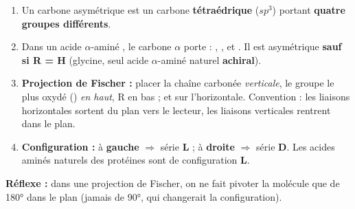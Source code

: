 \documentclass[11pt]{article}
\newcommand{\cle}[1]{{\popxbold\color{popdark}#1}}
\begin{document}
\begin{methode}
\begin{enumerate}
\item Un \cle{carbone asymétrique} est un carbone \textbf{tétraédrique} ($sp^3$) portant \textbf{quatre groupes différents}.
\item Dans un acide $\alpha$-aminé , le carbone $\alpha$ porte : , ,  et . Il est asymétrique \textbf{sauf si R = H} (glycine, seul acide $\alpha$-aminé naturel \textbf{achiral}).
\item \textbf{Projection de Fischer :} placer la chaîne carbonée \emph{verticale}, le groupe le plus oxydé () \emph{en haut}, R en bas ;  et  sur l'horizontale. Convention : les liaisons horizontales sortent du plan vers le lecteur, les liaisons verticales rentrent dans le plan.
\item \textbf{Configuration :}  à \textbf{gauche} $\Rightarrow$ série \textbf{L} ;  à \textbf{droite} $\Rightarrow$ série \textbf{D}. Les acides aminés naturels des protéines sont de configuration \textbf{L}.
\end{enumerate}
\textbf{Réflexe :} dans une projection de Fischer, on ne fait pivoter la molécule que de 180° dans le plan (jamais de 90°, qui changerait la configuration).
\end{methode}
\end{document}
